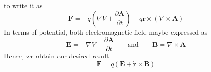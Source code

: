 \documentclass[../../../main.tex]{subfiles}
\begin{document}
to write it as 
\begin{equation*}
	\mathbf{F }=-q \left( \nabla V+\frac{\partial \mathbf{A }}{\partial t } \right) +q \dot{\mathbf{r }}\times \left( \nabla \times \mathbf{A} \right) 
\end{equation*}
In terms of potential, both electromagnetic field maybe expressed as
\begin{equation*}
	\mathbf{E}=-\nabla V-\frac{\partial \mathbf{A }}{\partial t}\qquad \text{and}\qquad \mathbf{B} =\nabla \times \mathbf{A}
\end{equation*} 
Hence, we obtain our desired result
\begin{equation*}
	\mathbf{F}=q \left( \mathbf{E}+\dot{\mathbf{r}}\times \mathbf{B} \right) 
\end{equation*}
\end{document}
